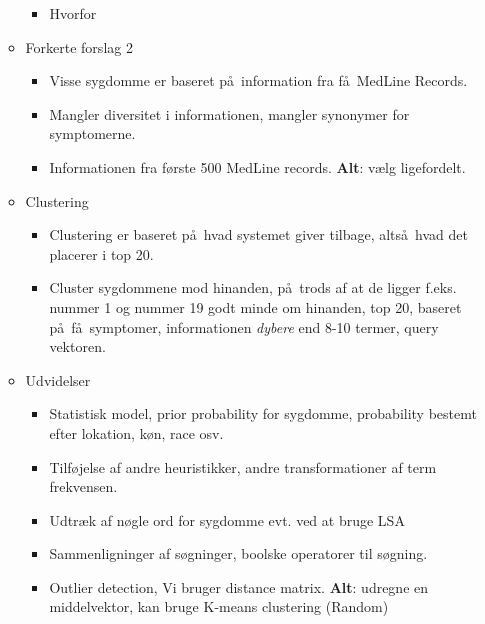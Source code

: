 \documentclass[a4paper, 10pt, english, final]{report}
\begin{document}
\begin{itemize}
\begin{itemize}
\begin{itemize}
          \item Hvorfor
        \end{itemize}
      \item Forkerte forslag 2
        \begin{itemize}
          \item Visse sygdomme er baseret p\aa\ information fra
            f\aa\ MedLine Records.
          \item Mangler diversitet i informationen, mangler synonymer
            for symptomerne.
          \item Informationen fra f\o rste 500 MedLine records. \textbf{Alt}:
            v\ae lg ligefordelt.
        \end{itemize}
      \item Clustering
        \begin{itemize}
          \item Clustering er baseret p\aa\ hvad systemet giver tilbage, alts\aa\ hvad det placerer i top 20.
          \item Cluster sygdommene mod hinanden, p\aa\ trods af at de
            ligger f.eks. nummer 1 og nummer 19 godt minde om
            hinanden, top 20, baseret p\aa\ f\aa\ symptomer,
            informationen \emph{dybere} end 8-10 termer, query vektoren.
        \end{itemize}
      \item Udvidelser
        \begin{itemize}
          \item Statistisk model, prior probability for sygdomme,
            probability bestemt efter lokation, k\o n, race osv.
          \item Tilf\o jelse af andre heuristikker, andre
            transformationer af term frekvensen.
          \item Udtr\ae k af n\o gle ord for sygdomme evt. ved at
            bruge LSA
          \item Sammenligninger af s\o gninger, boolske operatorer til
            s\o gning.
          \item Outlier detection, Vi bruger distance matrix. \textbf{Alt}:
            udregne en middelvektor, kan bruge K-means clustering (Random)
        \end{itemize}
    \end{itemize}

\end{itemize}
\end{document}
